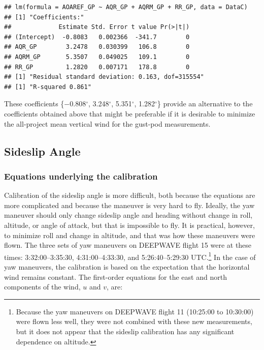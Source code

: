 \documentclass[12pt,twoside,english]{article}\usepackage[]{graphicx}\usepackage[]{color}
\makeatletter
\newenvironment{kframe}{%
 \def\at@end@of@kframe{}%
 \ifinner\ifhmode%
  \def\at@end@of@kframe{\end{minipage}}%
  \begin{minipage}{\columnwidth}%
 \fi\fi%
 \def\FrameCommand##1{\hskip\@totalleftmargin \hskip-\fboxsep
 \colorbox{shadecolor}{##1}\hskip-\fboxsep
     \hskip-\linewidth \hskip-\@totalleftmargin \hskip\columnwidth}%
 \MakeFramed {\advance\hsize-\width
   \@totalleftmargin\z@ \linewidth\hsize
   \@setminipage}}%
 {\par\unskip\endMakeFramed%
 \at@end@of@kframe}
\newenvironment{knitrout}{}{} %
\let\OrgIndex\index
\renewcommand*{\index}[1]{\OrgIndex{#1}}
\makeatother
\begin{document}
\begin{knitrout}\footnotesize
{}\color{fgcolor}\begin{kframe}
\begin{verbatim}
## lm(formula = AOAREF_GP ~ AQR_GP + AQRM_GP + RR_GP, data = DataC)
## [1] "Coefficients:"
##             Estimate Std. Error t value Pr(>|t|)
## (Intercept)  -0.8083   0.002366  -341.7        0
## AQR_GP        3.2478   0.030399   106.8        0
## AQRM_GP       5.3507   0.049025   109.1        0
## RR_GP         1.2820   0.007171   178.8        0
## [1] "Residual standard deviation: 0.163, dof=315554"
## [1] "R-squared 0.861"
\end{verbatim}
\end{kframe}
\end{knitrout}

These coefficients \{\ensuremath{-0.808}$^{\circ}$, 3.248$^{\circ}$, 5.351$^{\circ}$, 1.282$^{\circ}$\} provide an alternative to the coefficients obtained above that might be preferable if it is desirable to minimize the all-project mean vertical wind for the gust-pod measurements. 

\subsection{Sideslip Angle\label{sub:calibration-SS}}


\subsubsection{Equations underlying the calibration}

Calibration of the sideslip angle is more difficult, both because the equations are more complicated and because the maneuver is very hard to fly. Ideally, the yaw maneuver should only change sideslip angle and heading without change in roll, altitude, or angle of attack, but that is impossible to fly. It is practical, however, to minimize roll and change in altitude, and that was how these maneuvers were flown. The three sets of yaw maneuvers on DEEPWAVE flight 15 were at these times: 3:32:00--3:35:30, 4:31:00--4:33:30, and 5:26:40--5:29:30 UTC.\footnote{Because the yaw maneuvers on DEEPWAVE flight 11 (10:25:00 to 10:30:00) were flown less well, they were not combined with these new measurements, but it does not appear that the sideslip calibration has any significant dependence on altitude.} In the case of yaw maneuvers, the calibration is based on the expectation that the horizontal wind remains constant. The first-order equations for the east and north components of the wind, $u$ and $v$, are: 
\end{document}

